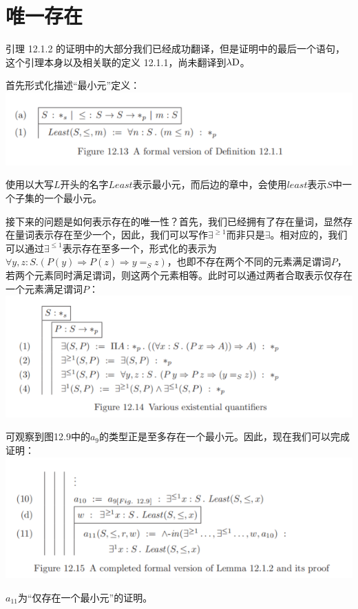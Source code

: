\documentclass[UTF8]{article}
\begin{document}
	\section{唯一存在}
	\noindent
	引理 12.1.2 的证明中的大部分我们已经成功翻译，但是证明中的最后一个语句，这个引理本身以及相关联的定义 12.1.1，尚未翻译到$\lambda{\rm D}$。
	
		首先形式化描述“最小元”定义：\\
		\includegraphics[width=0.93\linewidth]{"../imgs/12-11.png"}
		
		使用以大写$L$开头的名字$Least$表示最小元，而后边的章中，会使用$least$表示$S$中一个子集的一个最小元。
		
		接下来的问题是如何表示存在的唯一性？首先，我们已经拥有了存在量词，显然存在量词表示存在至少一个，因此，我们可以写作$\exists^{\ge 1}$而非只是$\exists$。相对应的，我们可以通过$\exists^{\le 1}$表示存在至多一个，形式化的表示为$\forall y,z:S.(P(y)\Rightarrow P(z)\Rightarrow y=_S z)$，也即不存在两个不同的元素满足谓词$P$，若两个元素同时满足谓词，则这两个元素相等。此时可以通过两者合取表示仅存在一个元素满足谓词$P$：\\
		\includegraphics[width=0.93\linewidth]{"../imgs/12-12.png"}
		
		可观察到图12.9中的$a_9$的类型正是至多存在一个最小元。因此，现在我们可以完成证明：\\
		\includegraphics[width=0.93\linewidth]{"../imgs/12-13.png"}
		
		$a_11$为“仅存在一个最小元”的证明。
\end{document}
